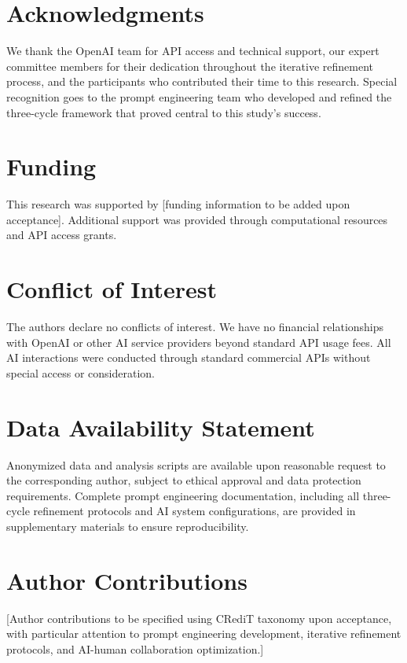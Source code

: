 \documentclass[12pt,a4paper]{article}
\begin{document}
\section{Acknowledgments}

We thank the OpenAI team for API access and technical support, our expert committee members for their dedication throughout the iterative refinement process, and the participants who contributed their time to this research. Special recognition goes to the prompt engineering team who developed and refined the three-cycle framework that proved central to this study's success.

\section{Funding}

This research was supported by [funding information to be added upon acceptance]. Additional support was provided through computational resources and API access grants.

\section{Conflict of Interest}

The authors declare no conflicts of interest. We have no financial relationships with OpenAI or other AI service providers beyond standard API usage fees. All AI interactions were conducted through standard commercial APIs without special access or consideration.

\section{Data Availability Statement}

Anonymized data and analysis scripts are available upon reasonable request to the corresponding author, subject to ethical approval and data protection requirements. Complete prompt engineering documentation, including all three-cycle refinement protocols and AI system configurations, are provided in supplementary materials to ensure reproducibility.

\section{Author Contributions}

[Author contributions to be specified using CRediT taxonomy upon acceptance, with particular attention to prompt engineering development, iterative refinement protocols, and AI-human collaboration optimization.]
\end{document}
